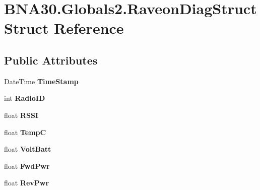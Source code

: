 \hypertarget{struct_b_n_a30_1_1_globals2_1_1_raveon_diag_struct}{}\section{B\+N\+A30.\+Globals2.\+Raveon\+Diag\+Struct Struct Reference}
\label{struct_b_n_a30_1_1_globals2_1_1_raveon_diag_struct}
\subsection*{Public Attributes}
\begin{DoxyCompactItemize}
\item 
\mbox{\label{struct_b_n_a30_1_1_globals2_1_1_raveon_diag_struct_af65fa349c142bf40adf6156c216081a0}} 
Date\+Time {\bfseries Time\+Stamp}
\item 
\mbox{\label{struct_b_n_a30_1_1_globals2_1_1_raveon_diag_struct_a0522f6289921626ac2c9f4f5b1c981f2}} 
int {\bfseries Radio\+ID}
\item 
\mbox{\label{struct_b_n_a30_1_1_globals2_1_1_raveon_diag_struct_aa62edc02e4d9c2f635dadb2cbeb82efb}} 
float {\bfseries R\+S\+SI}
\item 
\mbox{\label{struct_b_n_a30_1_1_globals2_1_1_raveon_diag_struct_a15c7a27f0ac0543e0cebcfeea983efc6}} 
float {\bfseries TempC}
\item 
\mbox{\label{struct_b_n_a30_1_1_globals2_1_1_raveon_diag_struct_af903bf419084ed0df515b3ac5bf45a35}} 
float {\bfseries Volt\+Batt}
\item 
\mbox{\label{struct_b_n_a30_1_1_globals2_1_1_raveon_diag_struct_a200bef928cd3de4b15a589bac489b9d8}} 
float {\bfseries Fwd\+Pwr}
\item 
\mbox{\label{struct_b_n_a30_1_1_globals2_1_1_raveon_diag_struct_aec4bcfe80cefe5973f4e61a0b27e7b0a}} 
float {\bfseries Rev\+Pwr}

\end{DoxyCompactItemize}
